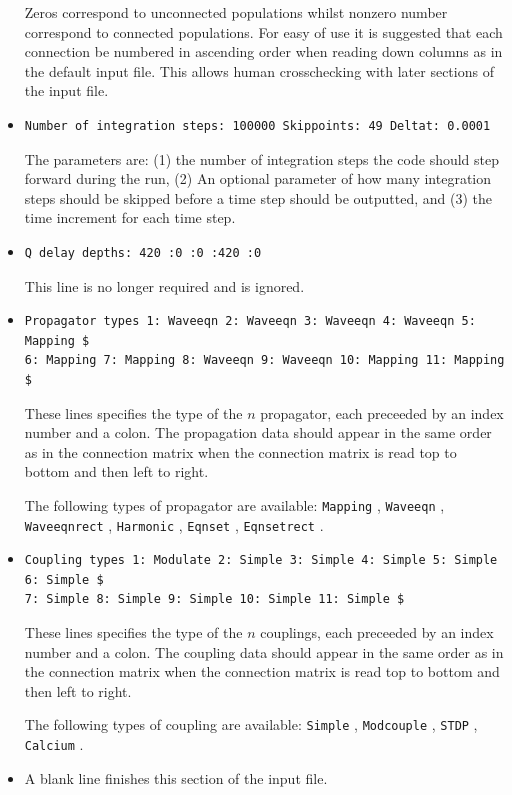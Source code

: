 \documentclass[12pt,a4paper]{article}
\newcommand{\type}[1]{ {\small\small\tt #1} }
\begin{document}
\begin{itemize}
Zeros correspond to unconnected populations whilst nonzero number correspond to connected populations. For easy of use it is suggested that each connection be numbered in ascending order when reading down columns as in the default input file. This allows human crosschecking with later sections of the input file.
\item
\begin{lstlisting}
Number of integration steps: 100000 Skippoints: 49 Deltat: 0.0001
\end{lstlisting}
The parameters are: 
(1) the number of integration steps the code should step forward during the run, (2) An optional parameter of how many integration steps should be skipped before a time step should be outputted, and (3) the time increment for each time step.

\item
\begin{lstlisting}
Q delay depths: 420 :0 :0 :420 :0
\end{lstlisting} This line is no longer required 
and is ignored.

\item
\begin{lstlisting}
Propagator types 1: Waveeqn 2: Waveeqn 3: Waveeqn 4: Waveeqn 5: Mapping $
6: Mapping 7: Mapping 8: Waveeqn 9: Waveeqn 10: Mapping 11: Mapping $
\end{lstlisting}
These lines specifies the type of the $n$ propagator, each preceeded by an index number and a colon. The propagation data should appear in the same order as in the connection matrix when the connection matrix is read top to bottom and then left to right.

The following types of propagator are available: \type{Mapping}, \type{Waveeqn},\type{Waveeqnrect}, \type{Harmonic}, \type{Eqnset}, \type{Eqnsetrect}.
\item
\begin{lstlisting}
Coupling types 1: Modulate 2: Simple 3: Simple 4: Simple 5: Simple 6: Simple $ 
7: Simple 8: Simple 9: Simple 10: Simple 11: Simple $
\end{lstlisting}
These lines specifies the type of the $n$ couplings, each preceeded by an index number and a colon. The coupling data should appear in the same order as in the connection matrix when the connection matrix is read top to bottom and then left to right.

The following types of coupling are available: \type{Simple}, \type{Modcouple}, \type{STDP}, \type{Calcium}.
\item A blank line finishes this section of the input file.
\end{itemize}
\end{document}
